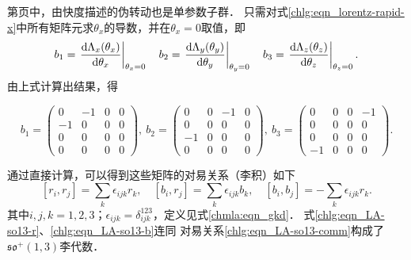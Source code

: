 第\pageref{chlg:sec_rapid}页中，由快度描述的伪转动也是单参数子群．
只需对式\eqref{chlg:eqn_lorentz-rapid-x}中所有矩阵元求$\theta_x$的导数，并在$\theta_x=0$取值，即
\begin{equation}
    b_1=\left.\frac{{\rm d}\Lambda_x(\theta_x)}{{\rm d}\theta_x}\right|_{\theta_x=0} \quad
    b_2=\left.\frac{{\rm d}\Lambda_y(\theta_y)}{{\rm d}\theta_y}\right|_{\theta_y=0} \quad
    b_3=\left.\frac{{\rm d}\Lambda_z(\theta_z)}{{\rm d}\theta_z}\right|_{\theta_z=0} .
\end{equation}
由上式计算出结果，得
\begin{small}  %
\begin{equation}\label{chlg:eqn_LA-so13-b}
    b_1=  \begin{pmatrix}
        0  & -1 & 0 & 0 \\
        -1 & 0  & 0 & 0 \\
        0 & 0 & 0 & 0 \\
        0 & 0 & 0 & 0 
    \end{pmatrix},\ 
    b_2 =  \begin{pmatrix}
        0  & 0 & -1 & 0 \\
        0 & 0  & 0 & 0 \\
        -1 & 0 & 0 & 0 \\
        0 & 0 & 0 & 0 
    \end{pmatrix},\ 
    b_3 =  \begin{pmatrix}
        0  & 0 & 0 & -1 \\
        0 & 0  & 0 & 0 \\
        0 & 0 & 0 & 0 \\
        -1 & 0 & 0 & 0 
    \end{pmatrix} .
\end{equation} %
\end{small}

通过直接计算，可以得到这些矩阵的对易关系（李积）如下
\begin{equation}\label{chlg:eqn_LA-so13-comm}
    [r_i, r_j] = \sum_k \epsilon_{ijk} r_k,\quad
    [b_i, r_j] = \sum_k \epsilon_{ijk} b_k,\quad
    [b_i, b_j] = -\sum_k \epsilon_{ijk} r_k.
\end{equation}
其中$i,j,k=1,2,3$；$\epsilon_{ijk}=\delta^{123}_{ijk}$，定义见式\eqref{chmla:eqn_gkd}．
式\eqref{chlg:eqn_LA-so13-r}、\eqref{chlg:eqn_LA-so13-b}连同
对易关系\eqref{chlg:eqn_LA-so13-comm}构成了$\mathfrak{so}^{+}(1,3)$李代数．




